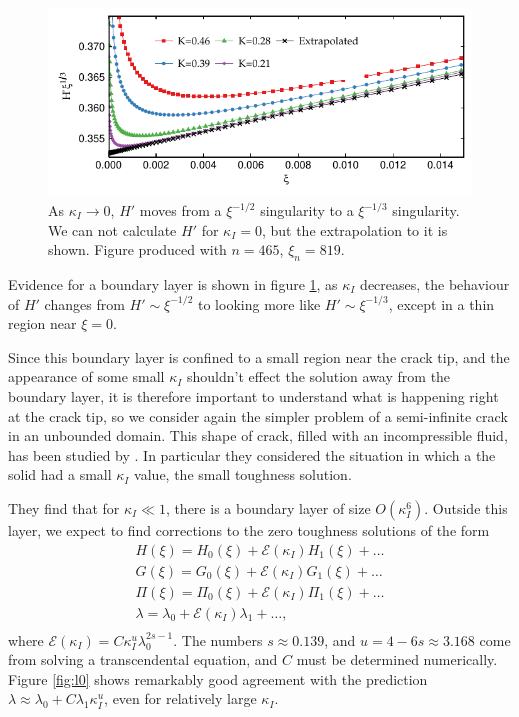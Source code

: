 \documentclass{jfm}
\newcommand{\cE}{\mathcal{E}}
\begin{document}
\begin{figure}
  \centerline{\includegraphics{./../../Graphs/hprime-x.pdf}}
  \caption{As $\kappa_I\to 0$, $H'$ moves from a $\xi^{-1/2}$ singularity
           to a $\xi^{-1/3}$ singularity. We can not calculate $H'$ for $\kappa_I=0$, 
           but the extrapolation to it is shown. Figure produced with $n=465$,
           $\xi_n = 819$.}\label{fig:hprime-x}
\end{figure}
Evidence for a boundary layer is shown in figure \ref{fig:hprime-x}, as
$\kappa_I$ decreases, the behaviour of $H'$ changes from $H' \sim \xi^{-1/2}$
to looking more like $H' \sim \xi^{-1/3}$, except in a thin region near 
$\xi =0$.

Since this boundary layer is confined to a small region near the crack tip, and
the appearance of some small $\kappa_I$ shouldn't effect the solution away from
the boundary layer, it is therefore important to understand what is 
happening right at the crack tip, so we consider again 
the simpler problem of a semi-infinite crack in an unbounded domain. This
shape of crack, filled with an incompressible fluid, has been studied by
\citet{Garagash}. In particular they considered the situation in which a
the solid had a small $\kappa_I$ value, the small toughness solution. 

They find that for $\kappa_I \ll 1$, there is a boundary layer of size 
$O(\kappa_I^6)$. Outside this layer, we expect to find corrections to the 
zero toughness solutions of the form
\begin{equation}
\begin{array}{c}
H(\xi) = H_0(\xi) + \cE(\kappa_I) H_1(\xi) + \dots \\
G(\xi) = G_0(\xi) + \cE(\kappa_I) G_1(\xi) + \dots \\
\Pi(\xi) = \Pi_0(\xi) + \cE(\kappa_I) \Pi_1(\xi) + \dots \\
\lambda = \lambda_0 + \cE(\kappa_I) \lambda_1 + \dots, \\
\end{array}
\end{equation}
where $\mathcal{E}(\kappa_I) = C \kappa_I^u\lambda_0^{2s-1}$. The numbers 
$s \approx 0.139$, and $u = 4 -6s \approx 3.168$
come from solving a transcendental equation, and $C$ must be determined 
numerically. Figure \ref{fig:l0} shows remarkably good agreement with the
prediction $\lambda \approx \lambda_0 + C\lambda_1 \kappa_I^u$, even for 
relatively large $\kappa_I$.
\end{document}
